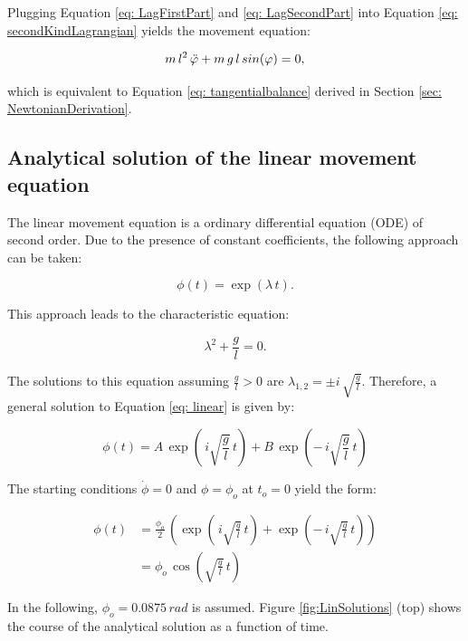 \documentclass[12pt,bibstyle=none,pagenumberinfooter]{ifmdocument}
\begin{document}
Plugging Equation \ref{eq: LagFirstPart} and \ref{eq: LagSecondPart} into Equation \ref{eq: secondKindLagrangian} yields the movement equation:

\begin{equation}
    m\,l^2\,\Ddot{\phi} + m\,g\,l\,sin(\phi) = 0,
\end{equation}

which is equivalent to Equation \ref{eq: tangentialbalance} derived in Section \ref{sec: NewtonianDerivation}.


\subsection{Analytical solution of the linear movement equation}

The linear movement equation is a ordinary differential equation (ODE) of second order. Due to the presence of constant coefficients, the following approach can be taken:

\begin{equation}
\label{eq: linear}
    \phi (t) = \exp{(\lambda \, t)}.
\end{equation}

This approach leads to the characteristic equation:

\begin{equation}
    \lambda^2 + \frac{g}{l} = 0.
\end{equation}

The solutions to this equation assuming $\frac{g}{l}>0$ are $\lambda_{1,2} = \pm i\,\sqrt{\frac{g}{l}}$. Therefore, a general solution to Equation \ref{eq: linear} is given by:

\begin{equation}
    \phi (t) = A\,\exp{\left(\,i\sqrt{\frac{g}{l}}\,t\right)} + B\, \exp{\left(-\,i\sqrt{\frac{g}{l}}\,t\right)}
\end{equation}

The starting conditions $\Dot{\phi} = 0$ and $\phi = \phi_o$ at $t_o = 0$ yield the form:

\begin{align}
    \phi(t)
    & = \frac{\phi_o}{2}\, \left(\exp{\left(\,i\sqrt{\frac{g}{l}}\,t\right)} + \exp{\left(-\,i\sqrt{\frac{g}{l}}\,t\right)} \right) \\
    & = \phi_o\,\cos{\left(\sqrt{\frac{g}{l}}\,t \right)}
\end{align}

In the following, $\phi_o = 0.0875\,rad$ is assumed. Figure \ref{fig:LinSolutions} (top) shows the course of the analytical solution as a function of time.
\end{document}

